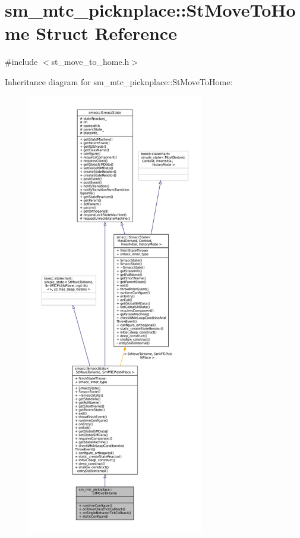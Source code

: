 \hypertarget{structsm__mtc__picknplace_1_1StMoveToHome}{}\section{sm\+\_\+mtc\+\_\+picknplace\+:\+:St\+Move\+To\+Home Struct Reference}
\label{structsm__mtc__picknplace_1_1StMoveToHome}


{\ttfamily \#include $<$st\+\_\+move\+\_\+to\+\_\+home.\+h$>$}



Inheritance diagram for sm\+\_\+mtc\+\_\+picknplace\+:\+:St\+Move\+To\+Home\+:
\nopagebreak
\begin{figure}[H]
\begin{center}
\leavevmode
\includegraphics[height=550pt]{structsm__mtc__picknplace_1_1StMoveToHome__inherit__graph}
\end{center}
\end{figure}


